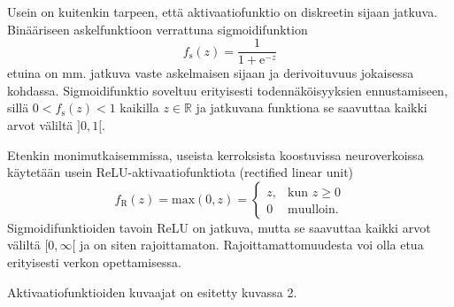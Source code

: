 \documentclass[12pt,a4paper,finnish,oneside,titlepage]{article}
\newcommand{\field}[1]{\mathbb{#1}}    %
\newcommand{\R}{\field{R}}             %
\theoremstyle{plain}
\theoremstyle{definition}
\theoremstyle{remark}
\begin{document}
Usein on kuitenkin tarpeen, että aktivaatiofunktio on diskreetin sijaan jatkuva. Binääriseen askelfunktioon verrattuna sigmoidifunktion \[f_{\text{s}}(z)=\frac{1}{1+\text{e}^{-z}}\]
etuina on mm. jatkuva vaste askelmaisen sijaan ja derivoituvuus jokaisessa kohdassa. Sigmoidifunktio soveltuu erityisesti todennäköisyyksien ennustamiseen, sillä \(0<f_\text{s}(z)<1\) kaikilla \(z\in \R\) ja jatkuvana funktiona se saavuttaa kaikki arvot väliltä \(]0, 1[\).

Etenkin monimutkaisemmissa, useista kerroksista koostuvissa neuroverkoissa käytetään usein ReLU-aktivaatiofunktiota (rectified linear unit)
\[f_{\text{R}}(z)=\text{max}(0, z)=\begin{cases} z, &\text{kun } z\geq 0\\ 0 &\text{muulloin.} \end{cases}\]
Sigmoidifunktioiden tavoin ReLU on jatkuva, mutta se saavuttaa kaikki arvot väliltä \([0, \infty[\) ja on siten rajoittamaton. Rajoittamattomuudesta voi olla etua erityisesti verkon opettamisessa.

Aktivaatiofunktioiden kuvaajat on esitetty kuvassa 2.
\end{document}
